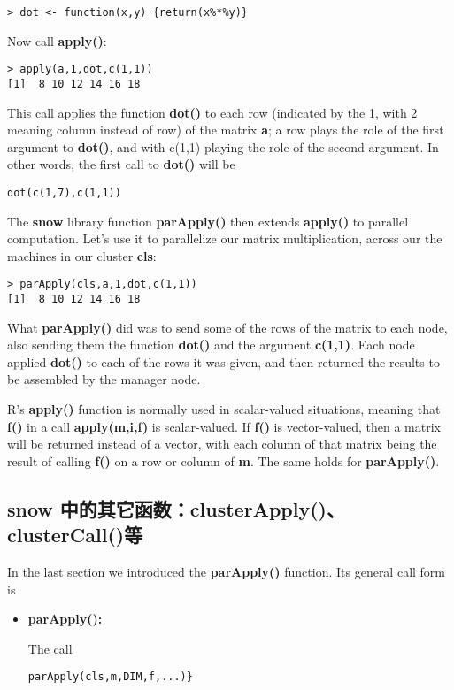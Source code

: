 \begin{lstlisting}
> dot <- function(x,y) {return(x%*%y)}
\end{lstlisting}

Now call {\bf apply()}:

\begin{lstlisting}
> apply(a,1,dot,c(1,1))
[1]  8 10 12 14 16 18
\end{lstlisting}

This call applies the function {\bf dot()} to each row (indicated by the
1, with 2 meaning column instead of row) of the matrix {\bf a}; a row
plays the role of the first argument to {\bf dot()}, and with c(1,1)
playing the role of the second argument.  In other words, the first call
to {\bf dot()} will be

\begin{lstlisting}
dot(c(1,7),c(1,1))
\end{lstlisting}

The {\bf snow} library function {\bf parApply()} then extends {\bf
apply()} to parallel computation.  Let's use it to parallelize our
matrix multiplication, across our the machines in our cluster {\bf cls}:

\begin{lstlisting}
> parApply(cls,a,1,dot,c(1,1))
[1]  8 10 12 14 16 18
\end{lstlisting}

What {\bf parApply()} did was to send some of the rows of the matrix to
each node, also sending them the function {\bf dot()} and the argument
{\bf c(1,1)}.  Each node applied {\bf dot()} to each of the rows it was
given, and then returned the results to be assembled by the manager node.

R's {\bf apply()} function is normally used in scalar-valued situations,
meaning that {\bf f()} in a call {\bf apply(m,i,f)} is scalar-valued.
If {\bf f()} is vector-valued, then a matrix will be returned instead of
a vector, with each column of that matrix being the result of calling
{\bf f()} on a row or column of {\bf m}.  The same holds for {\bf
parApply()}.

\subsection{snow 中的其它函数：clusterApply()、clusterCall()等}

In the last section we introduced the {\bf parApply()} function.  Its
general call form is

\begin{itemize}

\item {\bf parApply():}

The call

\begin{lstlisting}
parApply(cls,m,DIM,f,...)}
\end{lstlisting}

\end{itemize}


